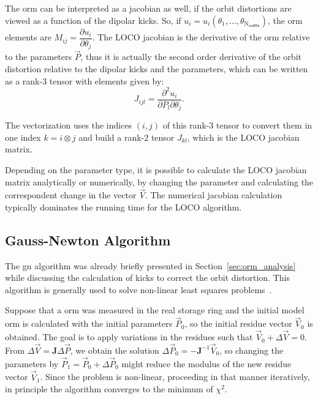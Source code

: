 The \gls{orm} can be interpreted as a jacobian as well, if the orbit distortions are viewed as a function of the dipolar kicks. So, if $u_i = u_i\left(\theta_1, \ldots, \theta_{\mathrm{N}_{\mathbf{corrs}}}\right)$, the \gls{orm} elements are $M_{ij} = \dfrac{\partial u_i}{\partial \theta_j}$. The LOCO jacobian is the derivative of the \gls{orm} relative to the parameters $\vec{P}$, thus it is actually the second order derivative of the orbit distortion relative to the dipolar kicks and the parameters, which can be written as a rank-3 tensor with elements given by:
\begin{equation}
    J_{ijl} = \dfrac{\partial^2 u_i}{\partial P_{l}\partial \theta_j}.
\end{equation}

The vectorization uses the indices $(i, j)$ of this rank-3 tensor to convert them in one index $k = i \otimes j$ and build a rank-2 tensor $J_{kl}$, which is the LOCO jacobian matrix.

Depending on the parameter type, it is possible to calculate the LOCO jacobian matrix analytically or numerically, by changing the parameter and calculating the correspondent change in the vector $\vec{V}$. The numerical jacobian calculation typically dominates the running time for the LOCO algorithm.
\subsection{Gauss-Newton Algorithm}
The \gls{gn} algorithm was already briefly presented in Section~\ref{sec:orm_analysis} while discussing the calculation of kicks to correct the orbit distortion. This algorithm is generally used to solve non-linear least squares problems~\cite{numerical_recipes}. 

Suppose that a \gls{orm} was measured in the real storage ring and the initial model \gls{orm} is calculated with the initial parameters $\vec{P}_0$, so the initial residue vector $\vec{V}_0$ is obtained. The goal is to apply variations in the residues such that $\vec{V}_0 + \Delta \vec{V} = 0$. From $\Delta \vec{V} = \mathbf{J}\Delta \vec{P}$, we obtain the solution $\Delta \vec{P}_0 = -\mathbf{J}^{-1} \vec{V}_0$, so changing the parameters by $\vec{P}_1 = \vec{P}_0 + \Delta \vec{P}_0$ might reduce the modulus of the new residue vector $\vec{V}_1$. Since the problem is non-linear, proceeding in that manner iteratively, in principle the algorithm converges to the minimum of $\chi^2$.

